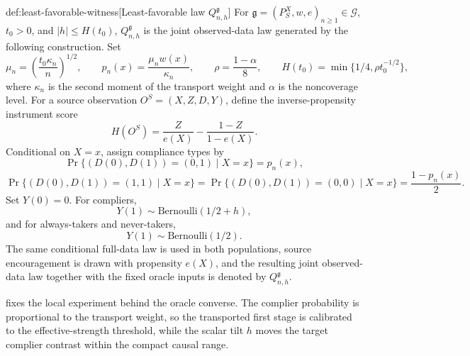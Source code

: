 \documentclass[11pt]{article}
\begin{document}
\begin{definitionv}{def:least-favorable-witness}[Least-favorable law \(Q_{n,h}^{\mathfrak g}\)]
For \(\mathfrak g=(P_S^X,w,e)_{n\ge1}\in\mathcal G\), \(t_0>0\), and \(|h|\le H(t_0)\), \(Q_{n,h}^{\mathfrak g}\) is the joint observed-data law generated by the following construction. Set
\[
\mu_n=\left(\frac{t_0\kappa_n}{n}\right)^{1/2},
\qquad
p_n(x)=\frac{\mu_n w(x)}{\kappa_n},
\qquad
\rho=\frac{1-\alpha}{8},
\qquad
H(t_0)=\min\{1/4,\rho t_0^{-1/2}\},
\]
where \(\kappa_n\) is the second moment of the transport weight and \(\alpha\) is the noncoverage level. For a source observation \(O^S=(X,Z,D,Y)\), define the inverse-propensity instrument score
\[
H(O^S)=\frac{Z}{e(X)}-\frac{1-Z}{1-e(X)}.
\]
Conditional on \(X=x\), assign compliance types by
\[
\Pr\{(D(0),D(1))=(0,1)\mid X=x\}=p_n(x),
\]
\[
\Pr\{(D(0),D(1))=(1,1)\mid X=x\}
=
\Pr\{(D(0),D(1))=(0,0)\mid X=x\}
=
\frac{1-p_n(x)}{2}.
\]
Set \(Y(0)=0\). For compliers,
\[
Y(1)\sim \mathrm{Bernoulli}(1/2+h),
\]
and for always-takers and never-takers,
\[
Y(1)\sim \mathrm{Bernoulli}(1/2).
\]
The same conditional full-data law is used in both populations, source encouragement is drawn with propensity \(e(X)\), and the resulting joint observed-data law together with the fixed oracle inputs is denoted by \(Q_{n,h}^{\mathfrak g}\).
\end{definitionv}

 fixes the local experiment behind the oracle converse. The complier probability is proportional to the transport weight, so the transported first stage is calibrated to the effective-strength threshold, while the scalar tilt \(h\) moves the target complier contrast within the compact causal range.
\end{document}

